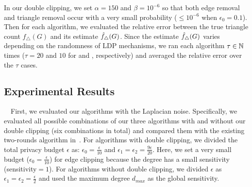 In our double clipping, we set $\alpha = 150$ and $\beta = 10^{-6}$ so that both edge removal and triangle removal occur with a very small probability ($\leq 10^{-6}$ when $\epsilon_0 = 0.1$). 
Then for each algorithm, we evaluated the relative error between the true triangle count $f_\triangle(G)$ and its estimate $\hat{f}_\triangle(G)$. 
Since the estimate $\hat{f}_\triangle(G)$ varies depending on the randomness of LDP mechanisms, we ran each algorithm $\tau \in \mathbb{N}$ times ($\tau=20$ and $10$ for \GPlus{} and \IMDB{}, respectively) and averaged the relative error over the $\tau$ cases.

\subsection{Experimental Results}
\label{sub:results}

\smallskip
~~First, 
we 
evaluated our algorithms with the Laplacian noise. 
Specifically, we evaluated all possible combinations of our three algorithms with and without our double clipping (six combinations in total) and compared them with 
the existing two-rounds algorithm in~\cite{Imola_USENIX21}.  
For algorithms with double clipping, we divided the total privacy budget $\epsilon$ as: 
$\epsilon_0 = \frac{\epsilon}{10}$ and 
$\epsilon_1 = \epsilon_2 = \frac{9\epsilon}{20}$. 
Here, we set a very small budget ($\epsilon_0 = \frac{\epsilon}{10}$) for edge clipping because the degree has a small sensitivity (sensitivity$=1$). 
For algorithms without double clipping, we divided $\epsilon$ as $\epsilon_1 = \epsilon_2 = \frac{\epsilon}{2}$ and 
used the maximum degree $d_{max}$ as the global sensitivity. 

